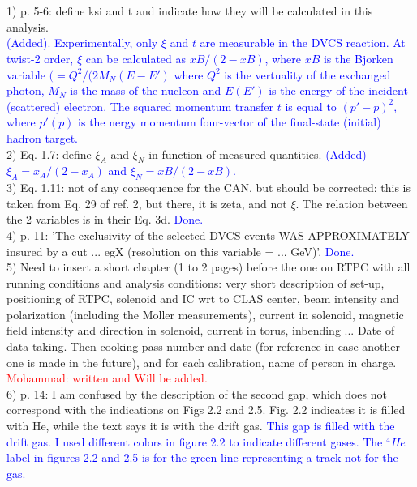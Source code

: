 \section*{}

1) p. 5-6: define ksi and t and indicate how they will be calculated in this 
analysis.\\
   \textcolor{blue}{ (Added). Experimentally, only  $\xi$ and $t$ are 
      measurable in the DVCS reaction. At twist-2 order, $\xi$ can be 
      calculated as $xB/(2-xB)$, where $xB$ is the Bjorken variable $(= 
      Q^{2}/(2M_{N}(E-E')$ where $Q^2$ is the vertuality of the exchanged 
      photon, $M_{N}$ is the mass of the nucleon and $E (E')$ is the energy of 
      the incident (scattered) electron. The squared
 momentum transfer $t$  is equal to $(p'- p)^{2}$, where $p' (p)$ is the nergy 
 momentum four-vector of the final-state (initial) hadron target. }\\

2) Eq. 1.7: define $\xi_{A}$ and $\xi_{N}$ in function of measured quantities.
\textcolor{blue}{   (Added)
  $ \xi_{A}= x_{A}/(2-x_{A})$ and  $\xi_{N}= xB/(2-xB)$.
}\\

3) Eq. 1.11: not of any consequence for the CAN, but should be corrected:  this 
is taken from Eq. 29 of ref. 2, but there, it is zeta, and not $\xi$. The 
relation between the 2 variables is in their Eq. 3d.
\textcolor{blue}{   Done.}\\

4) p. 11: 'The exclusivity of the selected DVCS events WAS APPROXIMATELY 
insured by a cut ... egX (resolution on this variable = ... GeV)'.
\textcolor{blue}{Done.}\\


5) Need to insert a short chapter (1 to 2 pages) before the one on RTPC with all 
running conditions and analysis conditions: very short description of set-up, 
positioning of RTPC, solenoid and IC wrt to CLAS center, beam intensity and 
polarization (including the Moller measurements), current in solenoid, magnetic 
field intensity and direction in solenoid, current in torus, inbending ... Date 
of data taking. Then cooking pass number and date (for reference in case 
another one is made in the future), and for each calibration, name of person in 
charge.
\textcolor{red}{Mohammad: written and Will be added.}\\


6) p. 14: I am confused by the description of the second gap, which does not 
correspond with the indications on Figs 2.2 and 2.5. Fig. 2.2 indicates it is 
filled with He, while the text says it is with the drift gas.
\textcolor{blue}{This gap is filled with the drift gas. I used different colors 
in figure 2.2 to indicate different gases. The $^{4}He$ label in figures 2.2 
and 2.5 is for the green line representing a track not for the gas. } \\

